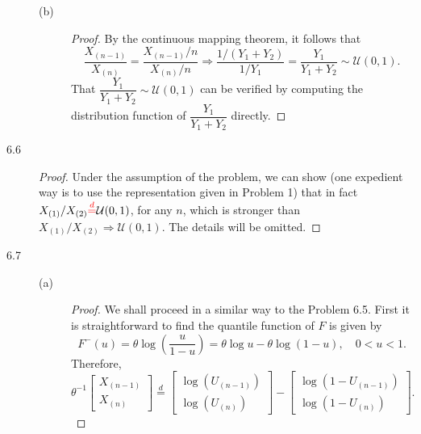 \documentclass{article}
\theoremstyle{definition}
\theoremstyle{plain}
\theoremstyle{remark}
\begin{document}
\begin{description}
\begin{description}
\item[(b)]
\begin{proof}
By the continuous mapping theorem, it follows that
\begin{equation*}
    \frac{X_{(n - 1)}}{X_{(n)}} = \frac{X_{(n - 1)}/n}{X_{(n)}/n}
    \Rightarrow \frac{1/(Y_1 + Y_2)}{1/Y_1} = \frac{Y_1}{Y_1 + Y_2}
    \sim \mathcal{U}(0, 1).
\end{equation*}
That $\dfrac{Y_1}{Y_1 + Y_2} \sim \mathcal{U}(0, 1)$ can be verified by 
computing the distribution function of $\dfrac{Y_1}{Y_1 + Y_2}$ directly.
\end{proof}
\end{description}

\item[6.6]
\begin{proof}
Under the assumption of the problem, we can show (one expedient way is to use the representation given in Problem 1) that in fact $X_{(1)}/X_{(2)} {\color{red}\overset{d}=} \mathcal{U}(0, 1)$, for any $n$, which is stronger than $X_{(1)}/X_{(2)} \Rightarrow \mathcal{U}(0, 1)$. The details will be omitted.
\end{proof}

\item[6.7]
\begin{description}
\item[(a)]
\begin{proof}
We shall proceed in a similar way to the Problem 6.5. First it is 
straightforward to find the quantile function of $F$ is given by
\begin{equation*}
    F^{-}(u) = \theta\log\left(\frac{u}{1 - u}\right) 
    = \theta \log u - \theta \log(1 - u), \quad 0 < u < 1.
\end{equation*}
Therefore, 
\begin{equation*}
    \theta^{-1}\begin{bmatrix}
    X_{(n - 1)} \\
    X_{(n)} 
    \end{bmatrix} \overset{d}= 
    \begin{bmatrix} 
    \log(U_{(n - 1)}) \\
    \log(U_{(n)})
    \end{bmatrix} - 
    \begin{bmatrix} 
    \log(1 - U_{(n - 1)}) \\
    \log(1 - U_{(n)})
    \end{bmatrix}.
\end{equation*}


\end{proof}
\end{description}
\end{description}
\end{document}
